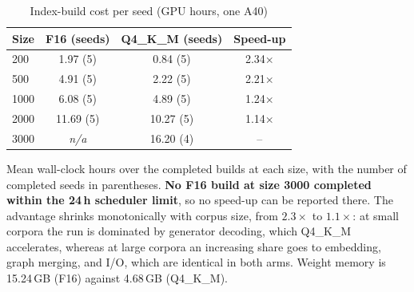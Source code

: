 \begin{table}[t]
\centering
\caption{Index-build cost per seed (GPU hours, one A40)}
\label{tab:cost}
\footnotesize
\setlength{\tabcolsep}{5pt}
\begin{tabular}{lccc}
\toprule
\textbf{Size} & \textbf{F16 (seeds)} & \textbf{Q4\_K\_M (seeds)} & \textbf{Speed-up} \\
\midrule
200 & 1.97 (5) & 0.84 (5) & 2.34$\times$ \\
\rowcolor{gray!10}500 & 4.91 (5) & 2.22 (5) & 2.21$\times$ \\
1000 & 6.08 (5) & 4.89 (5) & 1.24$\times$ \\
\rowcolor{gray!10}2000 & 11.69 (5) & 10.27 (5) & 1.14$\times$ \\
3000 & \emph{n/a} & 16.20 (4) & -- \\
\bottomrule
\end{tabular}
\parbox[t]{0.485\textwidth}{\vspace{0.1cm}Mean wall-clock hours over the completed builds at each size, with the number of completed seeds in parentheses. \textbf{No F16 build at size 3000 completed within the 24\,h scheduler limit}, so no speed-up can be reported there. The advantage shrinks monotonically with corpus size, from $2.3\times$ to $1.1\times$: at small corpora the run is dominated by generator decoding, which Q4\_K\_M accelerates, whereas at large corpora an increasing share goes to embedding, graph merging, and I/O, which are identical in both arms. Weight memory is 15.24\,GB (F16) against 4.68\,GB (Q4\_K\_M).}
\end{table}
